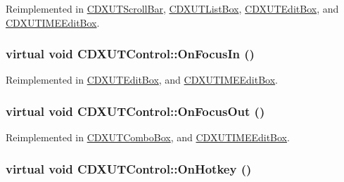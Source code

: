Reimplemented in \hyperlink{class_c_d_x_u_t_scroll_bar_a8c4363b3a1415d06e22906e706e1ff76}{CDXUTScrollBar}, \hyperlink{class_c_d_x_u_t_list_box_a05c8bdcfa42cb829df9b6797684ae938}{CDXUTListBox}, \hyperlink{class_c_d_x_u_t_edit_box_adca915977ba1b8019594ef5d350ed03e}{CDXUTEditBox}, and \hyperlink{class_c_d_x_u_t_i_m_e_edit_box_ac656a213385fb3245938f0297d58d0de}{CDXUTIMEEditBox}.\hypertarget{class_c_d_x_u_t_control_ab363eb5e296ddfc577f81bcd7667fd9b}{
\subsubsection[{OnFocusIn}]{\setlength{\rightskip}{0pt plus 5cm}virtual void CDXUTControl::OnFocusIn ()}}
\label{class_c_d_x_u_t_control_ab363eb5e296ddfc577f81bcd7667fd9b}


Reimplemented in \hyperlink{class_c_d_x_u_t_edit_box_adc767031600f1ea99ebcf533e00d7948}{CDXUTEditBox}, and \hyperlink{class_c_d_x_u_t_i_m_e_edit_box_a6f3ada4a18eb810420806d5112fd7de6}{CDXUTIMEEditBox}.\hypertarget{class_c_d_x_u_t_control_afd5667a4ba9349e98db8c27a1b1d280d}{
\subsubsection[{OnFocusOut}]{\setlength{\rightskip}{0pt plus 5cm}virtual void CDXUTControl::OnFocusOut ()}}
\label{class_c_d_x_u_t_control_afd5667a4ba9349e98db8c27a1b1d280d}


Reimplemented in \hyperlink{class_c_d_x_u_t_combo_box_a513be57f0d60315b255ef11f5998c268}{CDXUTComboBox}, and \hyperlink{class_c_d_x_u_t_i_m_e_edit_box_a32592319ff970787b0cfa1c59b61f4d6}{CDXUTIMEEditBox}.\hypertarget{class_c_d_x_u_t_control_a493169ad5b2877d6353eea95b697208e}{
\subsubsection[{OnHotkey}]{\setlength{\rightskip}{0pt plus 5cm}virtual void CDXUTControl::OnHotkey ()}}
\label{class_c_d_x_u_t_control_a493169ad5b2877d6353eea95b697208e}


